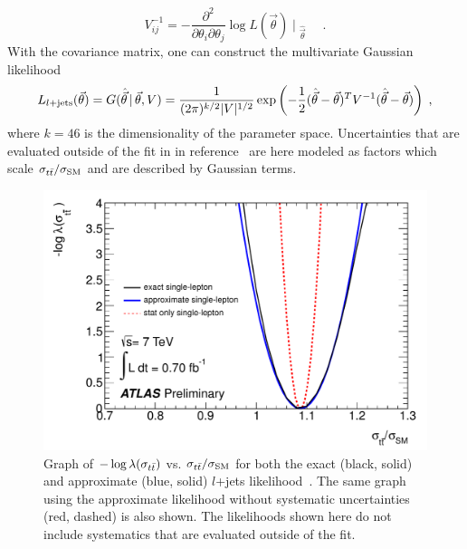 \begin{equation}
  V_{ij}^{-1} = - \frac{\partial^2 }{\partial \theta_i \partial \theta_j} \log L(\vec{\theta})\; {\bigg | \;}_{\hat{\vec{\theta}}} \; \quad .
\end{equation}
With the covariance matrix, one can construct the multivariate Gaussian likelihood 
\begin{equation} \label{eqn:ljetsLikelihood}
  L_{l+\rm jets}(\vec{\theta}) = G(\hat{\vec{\theta}}\, |\, \vec{\theta}, V) = \frac{1}{(2\pi)^{k/2} | V|^{1/2}} \exp\left( -\frac{1}{2} (\hat{\vec{\theta}} - \vec{\theta})^T  V^{-1} (\hat{\vec{\theta}} - \vec{\theta})  \right) \;, 
\end{equation}
where $k=46$ is the dimensionality of the parameter space.  
Uncertainties that are evaluated outside of the fit in in reference~\cite{LEPTON_JETS_NOTE_2011} are here modeled as factors which scale $\sigma_{t\bar{t}}/\sigma_{\rm SM}$ and are described by Gaussian terms.


\begin{figure}[htbp]
  \begin{center}
    \includegraphics[width=.5\textwidth]{figures/comb/ljets_likelihood_curve}
    \caption{Graph of $-\log\lambda(\sigma_{t\bar{t}})$ vs. $\sigma_{t\bar{t}}/\sigma_{\rm SM}$ for both the exact (black, solid) and approximate (blue, solid) $l$+jets likelihood~\cite{LEPTON_JETS_NOTE_2011}.  
The same graph using the approximate likelihood without systematic uncertainties (red, dashed) is also shown.  
The likelihoods shown here do not include systematics that are evaluated outside of the fit.}
    \label{fig:ljets_combined}
  \end{center}
\end{figure}

